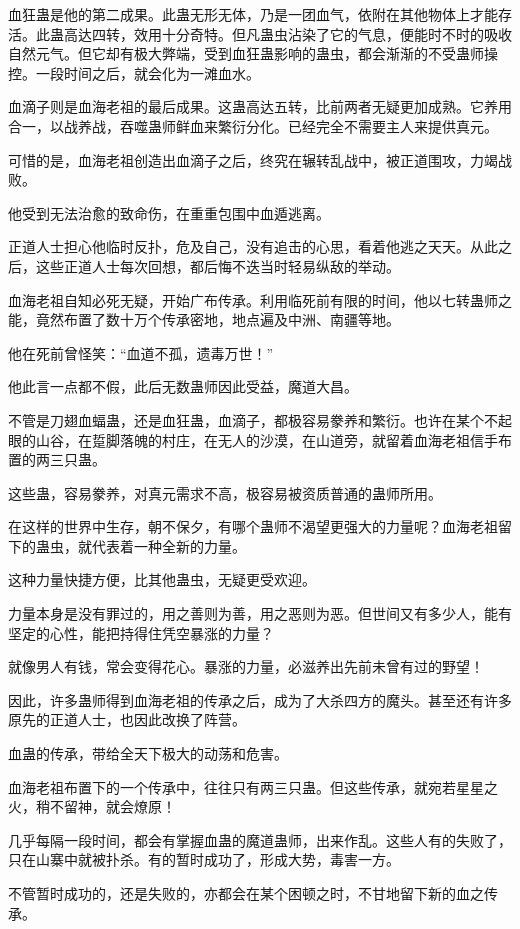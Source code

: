 \begin{this_body}
血狂蛊是他的第二成果。此蛊无形无体，乃是一团血气，依附在其他物体上才能存活。此蛊高达四转，效用十分奇特。但凡蛊虫沾染了它的气息，便能时不时的吸收自然元气。但它却有极大弊端，受到血狂蛊影响的蛊虫，都会渐渐的不受蛊师操控。一段时间之后，就会化为一滩血水。

血滴子则是血海老祖的最后成果。这蛊高达五转，比前两者无疑更加成熟。它养用合一，以战养战，吞噬蛊师鲜血来繁衍分化。已经完全不需要主人来提供真元。

可惜的是，血海老祖创造出血滴子之后，终究在辗转乱战中，被正道围攻，力竭战败。

他受到无法治愈的致命伤，在重重包围中血遁逃离。

正道人士担心他临时反扑，危及自己，没有追击的心思，看着他逃之天天。从此之后，这些正道人士每次回想，都后悔不迭当时轻易纵敌的举动。

血海老祖自知必死无疑，开始广布传承。利用临死前有限的时间，他以七转蛊师之能，竟然布置了数十万个传承密地，地点遍及中洲、南疆等地。

他在死前曾怪笑：“血道不孤，遗毒万世！”

他此言一点都不假，此后无数蛊师因此受益，魔道大昌。

不管是刀翅血蝠蛊，还是血狂蛊，血滴子，都极容易豢养和繁衍。也许在某个不起眼的山谷，在踅脚落魄的村庄，在无人的沙漠，在山道旁，就留着血海老祖信手布置的两三只蛊。

这些蛊，容易豢养，对真元需求不高，极容易被资质普通的蛊师所用。

在这样的世界中生存，朝不保夕，有哪个蛊师不渴望更强大的力量呢？血海老祖留下的蛊虫，就代表着一种全新的力量。

这种力量快捷方便，比其他蛊虫，无疑更受欢迎。

力量本身是没有罪过的，用之善则为善，用之恶则为恶。但世间又有多少人，能有坚定的心性，能把持得住凭空暴涨的力量？

就像男人有钱，常会变得花心。暴涨的力量，必滋养出先前未曾有过的野望！

因此，许多蛊师得到血海老祖的传承之后，成为了大杀四方的魔头。甚至还有许多原先的正道人士，也因此改换了阵营。

血蛊的传承，带给全天下极大的动荡和危害。

血海老祖布置下的一个传承中，往往只有两三只蛊。但这些传承，就宛若星星之火，稍不留神，就会燎原！

几乎每隔一段时间，都会有掌握血蛊的魔道蛊师，出来作乱。这些人有的失败了，只在山寨中就被扑杀。有的暂时成功了，形成大势，毒害一方。

不管暂时成功的，还是失败的，亦都会在某个困顿之时，不甘地留下新的血之传承。


\end{this_body}
